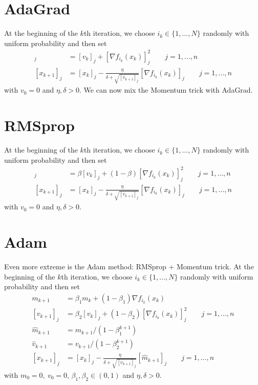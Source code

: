 \documentclass[12pt, openany]{report}
\theoremstyle{definition}
\begin{document}
\section{AdaGrad}
At the beginning of the $k$th iteration, we choose $i_k\in \{1,\dots,N\}$ randomly with uniform probability and then set 
\begin{align}
    [v_{k+1}]_j &= [v_k]_j + [\nabla f_{i_k}(x_k)]_j^2 \qquad j = 1,\dots, n\nonumber \\
    [x_{k+1}]_j &= [x_k]_j - \frac{\eta}{\delta + \sqrt{[v_{k+1}]_j}}[\nabla f_{i_k}(x_k)]_j\qquad j=1,\dots, n
\end{align}
with $v_0=0$ and $\eta, \delta >0$.
We can now mix the Momentum trick with AdaGrad.
\section{RMSprop}
At the beginning of the $k$th iteration, we choose $i_k\in \{1,\dots,N\}$ randomly with uniform probability and then set 
\begin{align}
    [v_{k+1}]_j &= \beta[v_k]_j + (1-\beta)[\nabla f_{i_k}(x_k)]_j^2 \qquad j = 1,\dots, n\nonumber \\
    [x_{k+1}]_j &= [x_k]_j - \frac{\eta}{\delta + \sqrt{[v_{k+1}]_j}}[\nabla f_{i_k}(x_k)]_j\qquad j=1,\dots, n
\end{align}
with $v_0=0$ and $\eta, \delta >0$.
\section{Adam}
Even more extreme is the Adam method: RMSprop + Momentum trick.
At the beginning of the $k$th iteration, we choose $i_k\in \{1,\dots,N\}$ randomly with uniform probability and then set 
\begin{align}
    m_{k+1} &= \beta_1m_k + (1-\beta_1)\nabla f_{i_k}(x_k)\nonumber \\
    [v_{k+1}]_j &= \beta_2[v_k]_j + (1-\beta_2)[\nabla f_{i_k}(x_k)]_j^2 \qquad j = 1,\dots, n\nonumber \\
    \hat m_{k+1} &= m_{k+1}/\left(1-\beta_1^{k+1}\right)\\
    \hat v_{k+1} &= v_{k+1}/\left(1-\beta_2^{k+1}\right)\nonumber \\
    [x_{k+1}]_j &= [x_k]_j - \frac{\eta}{\delta + \sqrt{[v_{k+1}]_j}}[\hat m_{k+1}]_j\qquad j=1,\dots, n\nonumber 
\end{align}
with $m_0=0, \: v_0=0$, $\beta_1,\beta_2\in (0,1)$ and $\eta, \delta >0$.
\end{document}
